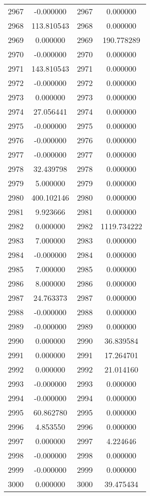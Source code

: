 \documentclass[12pt]{article}
\begin{document}
\begin{longtable}{@{}cccc@{}}
2967 & -0.000000 & 2967 & 0.000000 \\
2968 & 113.810543 & 2968 & 0.000000 \\
2969 & 0.000000 & 2969 & 190.778289 \\
2970 & -0.000000 & 2970 & 0.000000 \\
2971 & 143.810543 & 2971 & 0.000000 \\
2972 & -0.000000 & 2972 & 0.000000 \\
2973 & 0.000000 & 2973 & 0.000000 \\
2974 & 27.056441 & 2974 & 0.000000 \\
2975 & -0.000000 & 2975 & 0.000000 \\
2976 & -0.000000 & 2976 & 0.000000 \\
2977 & -0.000000 & 2977 & 0.000000 \\
2978 & 32.439798 & 2978 & 0.000000 \\
2979 & 5.000000 & 2979 & 0.000000 \\
2980 & 400.102146 & 2980 & 0.000000 \\
2981 & 9.923666 & 2981 & 0.000000 \\
2982 & 0.000000 & 2982 & 1119.734222 \\
2983 & 7.000000 & 2983 & 0.000000 \\
2984 & -0.000000 & 2984 & 0.000000 \\
2985 & 7.000000 & 2985 & 0.000000 \\
2986 & 8.000000 & 2986 & 0.000000 \\
2987 & 24.763373 & 2987 & 0.000000 \\
2988 & -0.000000 & 2988 & 0.000000 \\
2989 & -0.000000 & 2989 & 0.000000 \\
2990 & 0.000000 & 2990 & 36.839584 \\
2991 & 0.000000 & 2991 & 17.264701 \\
2992 & 0.000000 & 2992 & 21.014160 \\
2993 & -0.000000 & 2993 & 0.000000 \\
2994 & -0.000000 & 2994 & 0.000000 \\
2995 & 60.862780 & 2995 & 0.000000 \\
2996 & 4.853550 & 2996 & 0.000000 \\
2997 & 0.000000 & 2997 & 4.224646 \\
2998 & -0.000000 & 2998 & 0.000000 \\
2999 & -0.000000 & 2999 & 0.000000 \\
3000 & 0.000000 & 3000 & 39.475434 \\

\end{longtable}
\end{document}
